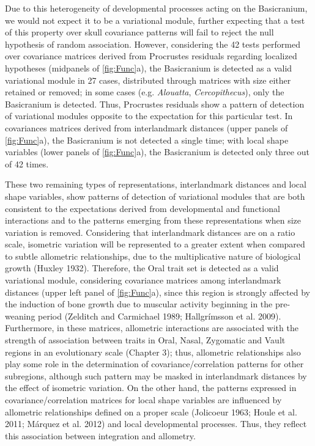 \documentclass[12pt,]{article}
\begin{document}
Due to this heterogeneity of developmental processes acting on the
Basicranium, we would not expect it to be a variational module, further
expecting that a test of this property over skull covariance patterns
will fail to reject the null hypothesis of random association. However,
considering the 42 tests performed over covariance matrices derived from
Procrustes residuals regarding localized hypotheses (midpanels of
\autoref{fig:Func}a), the Basicranium is detected as a valid variational
module in 27 cases, distributed through matrices with size either
retained or removed; in some cases (e.g. \emph{Alouatta},
\emph{Cercopithecus}), only the Basicranium is detected. Thus,
Procrustes residuals show a pattern of detection of variational modules
opposite to the expectation for this particular test. In covariances
matrices derived from interlandmark distances (upper panels of
\autoref{fig:Func}a), the Basicranium is not detected a single time;
with local shape variables (lower panels of \autoref{fig:Func}a), the
Basicranium is detected only three out of 42 times.

These two remaining types of representations, interlandmark distances
and local shape variables, show patterns of detection of variational
modules that are both consistent to the expectations derived from
developmental and functional interactions and to the patterns emerging
from these representations when size variation is removed. Considering
that interlandmark distances are on a ratio scale, isometric variation
will be represented to a greater extent when compared to subtle
allometric relationships, due to the multiplicative nature of biological
growth (Huxley 1932). Therefore, the Oral trait set is detected as a
valid variational module, considering covariance matrices among
interlandmark distances (upper left panel of \autoref{fig:Func}a), since
this region is strongly affected by the induction of bone growth due to
muscular activity beginning in the pre-weaning period (Zelditch and
Carmichael 1989; Hallgrímsson et al. 2009). Furthermore, in these
matrices, allometric interactions are associated with the strength of
association between traits in Oral, Nasal, Zygomatic and Vault regions
in an evolutionary scale (Chapter 3); thus, allometric relationships
also play some role in the determination of covariance/correlation
patterns for other subregions, although such pattern may be masked in
interlandmark distances by the effect of isometric variation. On the
other hand, the patterns expressed in covariance/correlation matrices
for local shape variables are influenced by allometric relationships
defined on a proper scale (Jolicoeur 1963; Houle et al. 2011; Márquez et
al. 2012) and local developmental processes. Thus, they reflect this
association between integration and allometry.
\end{document}

